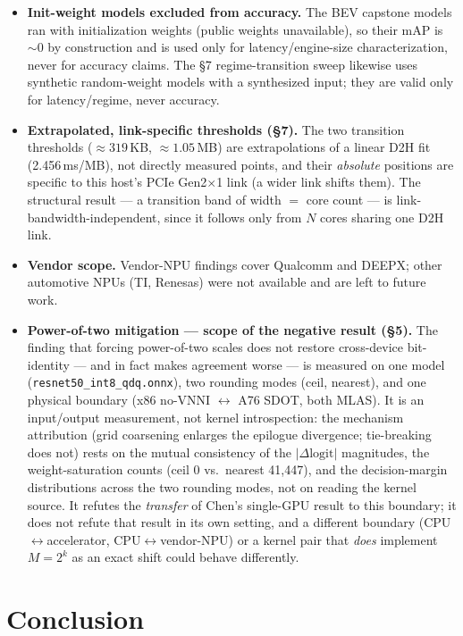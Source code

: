 \documentclass[11pt]{article}
\begin{document}
\begin{itemize}
\item \textbf{Init-weight models excluded from accuracy.} The BEV capstone models ran with initialization weights (public weights unavailable), so their mAP is ${\sim}0$ by construction and is used only for latency/engine-size characterization, never for accuracy claims. The \S7 regime-transition sweep likewise uses synthetic random-weight models with a synthesized input; they are valid only for latency/regime, never accuracy.
\item \textbf{Extrapolated, link-specific thresholds (\S7).} The two transition thresholds (${\approx}319$\,KB, ${\approx}1.05$\,MB) are extrapolations of a linear D2H fit (2.456\,ms/MB), not directly measured points, and their \emph{absolute} positions are specific to this host's PCIe Gen2$\times$1 link (a wider link shifts them). The structural result --- a transition band of width $=$ core count --- is link-bandwidth-independent, since it follows only from $N$ cores sharing one D2H link.
\item \textbf{Vendor scope.} Vendor-NPU findings cover Qualcomm and DEEPX; other automotive NPUs (TI, Renesas) were not available and are left to future work.
\item \textbf{Power-of-two mitigation --- scope of the negative result (\S5).} The finding that forcing power-of-two scales does not restore cross-device bit-identity --- and in fact makes agreement worse --- is measured on one model (\texttt{resnet50\_int8\_qdq.onnx}), two rounding modes (ceil, nearest), and one physical boundary (x86 no-VNNI $\leftrightarrow$ A76 SDOT, both MLAS). It is an input/output measurement, not kernel introspection: the mechanism attribution (grid coarsening enlarges the epilogue divergence; tie-breaking does not) rests on the mutual consistency of the $|\Delta\mathrm{logit}|$ magnitudes, the weight-saturation counts (ceil 0 vs.\ nearest 41{,}447), and the decision-margin distributions across the two rounding modes, not on reading the kernel source. It refutes the \emph{transfer} of Chen's single-GPU result to this boundary; it does not refute that result in its own setting, and a different boundary (CPU$\leftrightarrow$accelerator, CPU$\leftrightarrow$vendor-NPU) or a kernel pair that \emph{does} implement $M=2^k$ as an exact shift could behave differently.
\end{itemize}

\section{Conclusion}
\end{document}
